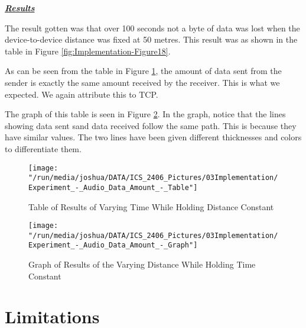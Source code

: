 \documentclass[12pt,svgnames,smaller]{article} %
\begin{document}
	
	\textbf{\textit{\underline{Results}}}
	
	The result gotten was that over 100 seconds not a byte of data was lost when the device-to-device distance was fixed at 50 metres. This result was as shown in the table in Figure \ref{fig:Implementation-Figure18}.
	
	As can be seen from the table in Figure \ref{fig:Implementation-Figure19}, the amount of data sent from the sender is exactly the same amount received by the receiver. This is what we expected. We again attribute this to TCP. 
	
	The graph of this table is seen in Figure \ref{fig:Implementation-Figure20}. In the graph, notice that the lines showing data sent sand data received follow the same path. This is because they have similar values. The two lines have been given different thicknesses and colors to differentiate them.
	
	\begin{figure}
		\centering
		\texttt{[image: "/run/media/joshua/DATA/ICS\_2406\_Pictures/03Implementation/Experiment\_-\_Audio\_Data\_Amount\_-\_Table"]}
		\caption{Table of Results of Varying Time While Holding Distance Constant}
		\label{fig:Implementation-Figure19}			
	\end{figure} 
	
	\begin{figure}
		\centering
		\texttt{[image: "/run/media/joshua/DATA/ICS\_2406\_Pictures/03Implementation/Experiment\_-\_Audio\_Data\_Amount\_-\_Graph"]}
		\caption{Graph of Results of the Varying Distance While Holding Time Constant}
		\label{fig:Implementation-Figure20}			
	\end{figure} 
	
	


	
	\section{\textbf{Limitations}}
\end{document}

